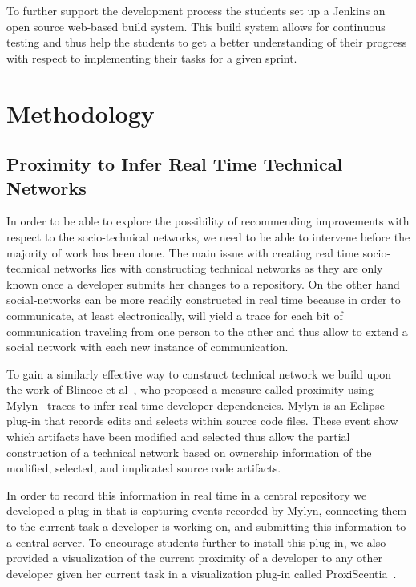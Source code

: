 To further support the development process the students set up a Jenkins an open source web-based build system.
This build system allows for continuous testing and thus help the students to get a better understanding of their progress with respect to implementing their tasks for a given sprint.

\section{Methodology}
\subsection{Proximity to Infer Real Time Technical Networks}
\label{chap:making:subset:proximity}
In order to be able to explore the possibility of recommending improvements with respect to the socio-technical networks, we need to be able to intervene before the majority of work has been done.
The main issue with creating real time socio-technical networks lies with constructing technical networks as they are only known once a developer submits her changes to a repository.
On the other hand social-networks can be more readily constructed in real time because in order to communicate, at least electronically, will yield a trace for each bit of communication traveling from one person to the other and thus allow to extend a social network with each new instance of communication.

To gain a similarly effective way to construct technical network we build upon the work of Blincoe et al~\cite{blincoe:cscw:2012}, who proposed a measure called proximity using Mylyn~\cite{kersten:aosd:2005} traces to infer real time developer dependencies.
Mylyn is an Eclipse plug-in that records edits and selects within source code files.
These event show which artifacts have been modified and selected thus allow the partial construction of a technical network based on ownership information of the modified, selected, and implicated source code artifacts.

In order to record this information in real time in a central repository we developed a plug-in that is capturing events recorded by Mylyn, connecting them to the current task a developer is working on, and submitting this information to a central server. 
To encourage students further to install this plug-in, we also provided a visualization of the current proximity of a developer to any other developer given her current task in a visualization plug-in called ProxiScentia~\cite{borici:chase:2012}.

